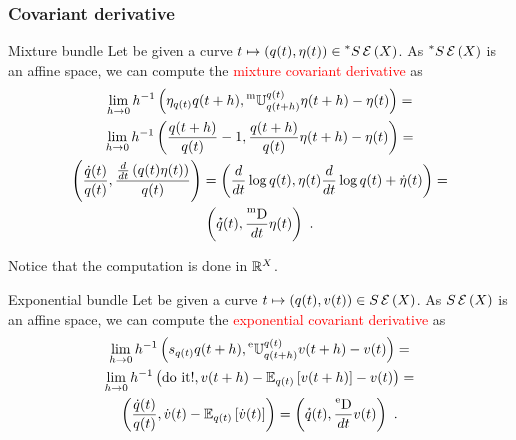 \documentclass[xcolor=svgnames]{beamer}
\DeclareMathOperator{\eDeriv}{\prescript{\text{e}}{}D}
\DeclareMathOperator{\mDeriv}{\prescript{\text{m}}{}D}
\newcommand{\eDerivby}[1]{\frac{\eDeriv}{d#1}}
\newcommand{\mDerivby}[1]{\frac{\mDeriv}{d#1}}
\newcommand{\mixbundleat}[1]{\prescript{*}{}S\maxexpat{#1}}
\newcommand{\rosso}[1]{\textcolor{red}{#1}}
\renewcommand{\emph}{\rosso}
\begin{document}
  \begin{frame}\small\frametitle{Covariant derivative}

    \begin{block}{Mixture bundle}
      Let be given a curve $t \mapsto (q(t),\eta(t)) \in \mixbundleat X$. As $\mixbundleat X$ is an affine space, we can compute the \emph{mixture covariant derivative} as
      \begin{multline*}
        \lim_{h \to 0} h^{-1}\left(\eta_{q(t)}{q(t+h)},\mtransport {q(t+h)}{q(t)} \eta(t+h) - \eta(t)\right) = \\
        \lim_{h \to 0} h^{-1}\left(\frac{q(t+h)}{q(t)}-1 ,\frac {q(t+h)}{q(t)} \eta(t+h) - \eta(t)\right) = \\
        \left(\frac{\dot q(t)}{q(t)}, \frac{\derivby t \left(q(t) \eta(t)\right)}{q(t)}\right) = \left(\derivby t \log q(t), \eta(t) \derivby t \log q(t) + \dot \eta(t)\right) = \\ \left(\velocity q(t), \mDerivby t \eta(t)\right) \ .
      \end{multline*}
    \end{block}
    
    Notice that the computation is done in $\mathbb{R}^X$.

    \newpage
    
  \begin{block}{Exponential bundle}
      Let be given a curve $t \mapsto (q(t),v(t)) \in S\operatorname{\mathcal E}\left(X\right)$. As $S\operatorname{\mathcal E}\left(X\right)$ is an affine space, we can compute the \emph{exponential covariant derivative} as
      \begin{multline*}
        \lim_{h \to 0} h^{-1}\left(s_{q(t)}{q(t+h)},\etransport {q(t+h)}{q(t)} v(t+h) - v(t)\right) = \\
    \lim_{h \to 0} h^{-1}\left(\text{do it!} ,v(t+h) - \expectat {q(t)} {v(t+h)} - v(t)\right) = \\
        \left(\frac{\dot q(t)}{q(t)}, \dot v(t) - \expectat {q(t)} {\dot v(t)} \right) =  \left(\velocity q(t), \eDerivby t v(t)\right) \ .
      \end{multline*}
    \end{block}

  \end{frame}
\end{document}
